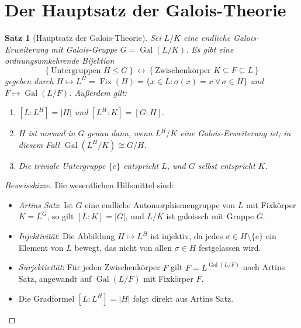 \documentclass[12pt,a4paper]{amsart}
\newtheorem{theorem}{Satz}[section]
\theoremstyle{definition}
\newcommand{\Gal}{\operatorname{Gal}}
\newcommand{\Fix}{\operatorname{Fix}}
\begin{document}
\section{Der Hauptsatz der Galois-Theorie}

\begin{theorem}[Hauptsatz der Galois-Theorie]
\label{thm:hauptsatz}
Sei $L/K$ eine endliche Galois-Erweiterung mit Galois-Gruppe $G = \Gal(L/K)$.
Es gibt eine ordnungsumkehrende Bijektion
\[
  \left\{\text{Untergruppen } H \leq G\right\}
  \longleftrightarrow
  \left\{\text{Zwischenkörper } K \subseteq F \subseteq L\right\}
\]
gegeben durch $H \mapsto L^H = \Fix(H) = \{x \in L : \sigma(x) = x\ \forall\,\sigma \in H\}$
und $F \mapsto \Gal(L/F)$. Außerdem gilt:
\begin{enumerate}[label=(\roman*)]
  \item $[L:L^H] = |H|$ und $[L^H:K] = [G:H]$.
  \item $H$ ist normal in $G$ genau dann, wenn $L^H/K$ eine Galois-Erweiterung
        ist; in diesem Fall $\Gal(L^H/K) \cong G/H$.
  \item Die triviale Untergruppe $\{e\}$ entspricht $L$, und $G$ selbst
        entspricht $K$.
\end{enumerate}
\end{theorem}

\begin{proof}[Beweisskizze]
Die wesentlichen Hilfsmittel sind:
\begin{itemize}
  \item \emph{Artins Satz}: Ist $G$ eine endliche Automorphismengruppe von $L$
        mit Fixkörper $K = L^G$, so gilt $[L:K] = |G|$, und $L/K$ ist galoissch
        mit Gruppe $G$.
  \item \emph{Injektivität}: Die Abbildung $H \mapsto L^H$ ist injektiv, da
        jedes $\sigma \in H \setminus \{e\}$ ein Element von $L$ bewegt, das
        nicht von allen $\sigma \in H$ festgelassen wird.
  \item \emph{Surjektivität}: Für jeden Zwischenkörper $F$ gilt
        $F = L^{\Gal(L/F)}$ nach Artins Satz, angewandt auf $\Gal(L/F)$
        mit Fixkörper $F$.
  \item Die Gradformel $[L:L^H] = |H|$ folgt direkt aus Artins Satz.
\end{itemize}
\end{proof}
\end{document}
